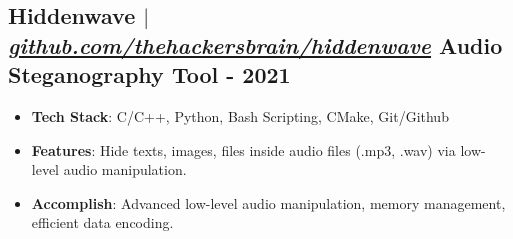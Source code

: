 \documentclass[11pt]{article}
\begin{document}
\subsection{Hiddenwave $|$ \normalfont\textit{\href{https://github.com/thehackersbrain/hiddenwave}{github.com/thehackersbrain/hiddenwave}} \hfill Audio Steganography Tool - \textbf{2021}}
\vspace{3pt}
\begin{itemize}
  \item \textbf{Tech Stack}: C/C++, Python, Bash Scripting, CMake, Git/Github
  \item \textbf{Features}: Hide texts, images, files inside audio files (.mp3, .wav) via low-level audio manipulation.
  \item \textbf{Accomplish}: Advanced low-level audio manipulation, memory management, efficient data encoding.
\end{itemize}
\end{document}
